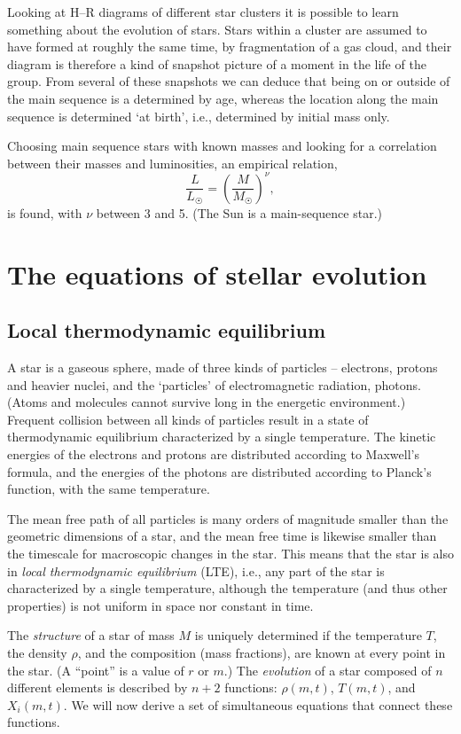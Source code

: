 \documentclass[10pt,amsmath,amssymb,aps,pra]{revtex4-2}
\newcommand{\Sun}{\astrosun}
\begin{document}
Looking at H--R diagrams of different star clusters it is possible to learn
something about the evolution of stars. Stars within a cluster are assumed to
have formed at roughly the same time, by fragmentation of a gas cloud, and their
diagram is therefore a kind of snapshot picture of a moment in the life of the
group. From several of these snapshots we can deduce that being on or outside
of the main sequence is a determined by age, whereas the location along the main
sequence is determined `at birth', i.e., determined by initial mass only.

Choosing main sequence stars with known masses and looking for a correlation
between their masses and luminosities, an empirical relation,
\begin{equation}
\frac{L}{L_{\Sun}}=\left(\frac{M}{M_{\Sun}}\right)^\nu,
\end{equation}
is found, with $\nu$ between 3 and 5. (The Sun is a main-sequence star.)

\section{The equations of stellar evolution}

\subsection{Local thermodynamic equilibrium}
A star is a gaseous sphere, made of three kinds of particles -- electrons,
protons and heavier nuclei, and the `particles' of electromagnetic radiation,
photons. (Atoms and molecules cannot survive long in the energetic environment.)
Frequent collision between all kinds of particles result in a state of
thermodynamic equilibrium characterized by a single temperature. The kinetic
energies of the electrons and protons are distributed according to Maxwell's
formula, and the energies of the photons are distributed according to Planck's
function, with the same temperature.

The mean free path of all particles is many orders of magnitude smaller than the
geometric dimensions of a star, and the mean free time is likewise smaller than
the timescale for macroscopic changes in the star. This means that the star is
also in \emph{local thermodynamic equilibrium} (LTE), i.e., any part of the star
is characterized by a single temperature, although the temperature (and thus
other properties) is not uniform in space nor constant in time.

The \emph{structure} of a star of mass $M$ is uniquely determined if the
temperature $T$, the density $\rho$, and the composition (mass fractions), are
known at every point in the star. (A ``point'' is a value of $r$ or $m$.) The
\emph{evolution} of a star composed of $n$ different elements is described by
$n+2$ functions: $\rho(m,t)$, $T(m,t)$, and $X_i(m,t)$. We will now derive a
set of simultaneous equations that connect these functions.
\end{document}
